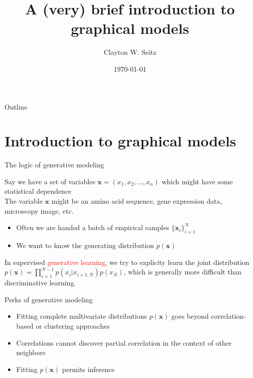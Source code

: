 \documentclass{beamer}					%
\title{A (very) brief introduction to graphical models}	%
\author{Clayton W. Seitz}								%
\date{\today}									%
\begin{document}
\begin{frame}
  \titlepage
\end{frame}

\begin{frame}{Outline}
  \tableofcontents
\end{frame}

%


\section{Introduction to graphical models}

\begin{frame}{The logic of generative modeling}

Say we have a set of variables $\mathbf{x} = (x_{1},x_{2},...,x_{n})$ which might have some statistical dependence\\
\vspace{0.1in}
The variable $\mathbf{x}$ might be an amino acid sequence, gene expression data, microscopy image, etc.\\
\vspace{0.1in}
\begin{itemize}
\item Often we are handed a batch of empirical samples $\{\mathbf{x}_{i}\}_{i=1}^{N}$
\item We want to know the generating distribution $p(\mathbf{x})$
\end{itemize}

In supervised \textcolor{red}{generative learning}, we try to explicity learn the joint distribution $p(\mathbf{x}) = \prod_{i=1}^{N-1}p(x_{i}|x_{i+1:N})p(x_{N})$, which is generally more difficult than discriminative learning. 

\end{frame}

\begin{frame}{Perks of generative modeling}

\begin{itemize}
\item Fitting complete multivariate distributions $p(\mathbf{x})$ goes beyond correlation-based or clustering approaches
\item Correlations cannot discover partial correlation in the context of other neighbors
\item Fitting $p(\mathbf{x})$ permits inference
\end{itemize}

\end{frame}
\end{document}
